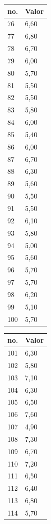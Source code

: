 \begin{table}[!ht]
\begin{tabular}{ |ll| }
\hline
 no. & Valor \\ \hline
76	&	6,60	\\ \hline
77	&	6,80	\\ \hline
78	&	6,70	\\ \hline
79	&	6,00	\\ \hline
80	&	5,70	\\ \hline
81	&	5,50	\\ \hline
82	&	5,50	\\ \hline
83	&	5,80	\\ \hline
84	&	6,00	\\ \hline
85	&	5,40	\\ \hline
86	&	6,00	\\ \hline
87	&	6,70	\\ \hline
88	&	6,30	\\ \hline
89	&	5,60	\\ \hline
90	&	5,50	\\ \hline
91	&	5,50	\\ \hline
92	&	6,10	\\ \hline
93	&	5,80	\\ \hline
94	&	5,00	\\ \hline
95	&	5,60	\\ \hline
96	&	5,70	\\ \hline
97	&	5,70	\\ \hline
98	&	6,20	\\ \hline
99	&	5,10	\\ \hline
100	&	5,70	\\ \hline
\end{tabular}
\begin{tabular}{ |ll| }
\hline
 no. & Valor \\ \hline
101	&	6,30	\\ \hline
102	&	5,80	\\ \hline
103	&	7,10	\\ \hline
104	&	6,30	\\ \hline
105	&	6,50	\\ \hline
106	&	7,60	\\ \hline
107	&	4,90	\\ \hline
108	&	7,30	\\ \hline
109	&	6,70	\\ \hline
110	&	7,20	\\ \hline
111	&	6,50	\\ \hline
112	&	6,40	\\ \hline
113	&	6,80	\\ \hline
114	&	5,70	\\ \hline

\end{tabular}
\end{table}
